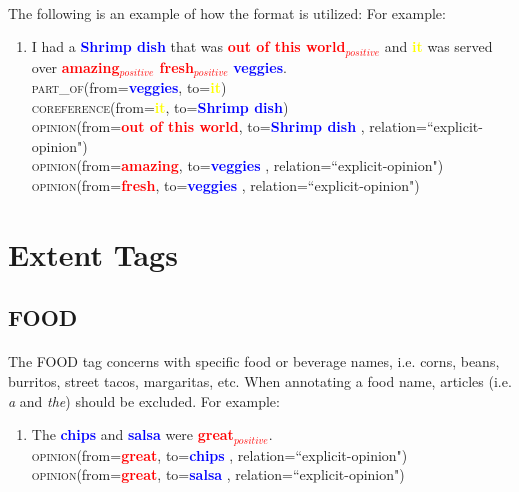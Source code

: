\documentclass{article}
\begin{document}
\paragraph{}
The following is an example of how the format is utilized:
For example:
\begin{enumerate}
\item I had a \textbf{\textcolor{blue}{Shrimp dish}} that was \textbf{\textcolor{red}{out of this world$_{positive}$}} and \textbf{\textcolor{yellow}{it}} was served over \textbf{\textcolor{red}{amazing$_{positive}$ fresh$_{positive}$}} \textbf{\textcolor{blue}{veggies}}. \\
\textsc{part\_of}(from=\textbf{\textcolor{blue}{veggies}}, to=\textbf{\textcolor{yellow}{it}}) \\
\textsc{coreference}(from=\textbf{\textcolor{yellow}{it}}, to=\textbf{\textcolor{blue}{Shrimp dish}})\\
\textsc{opinion}(from=\textbf{\textcolor{red}{out of this world}}, to=\textbf{\textcolor{blue}{Shrimp dish}} , relation=``explicit-opinion")\\
\textsc{opinion}(from=\textbf{\textcolor{red}{amazing}}, to=\textbf{\textcolor{blue}{veggies}} , relation=``explicit-opinion")\\
\textsc{opinion}(from=\textbf{\textcolor{red}{fresh}}, to=\textbf{\textcolor{blue}{veggies}} , relation=``explicit-opinion")
\end{enumerate}

\newpage
\section{Extent Tags}

\subsection{FOOD}
\paragraph{}
The FOOD tag concerns with specific food or beverage names, i.e. corns, beans, burritos, street tacos, margaritas, etc. When annotating a food name, articles (i.e. \textit{a} and \textit{the}) should be excluded. For example:
\begin{enumerate}[resume]
\item The \textbf{\textcolor{blue}{chips}} and \textbf{\textcolor{blue}{salsa}} were \textbf{\textcolor{red}{great$_{positive}$}}.\\
\textsc{opinion}(from=\textbf{\textcolor{red}{great}}, to=\textbf{\textcolor{blue}{chips}} , relation=``explicit-opinion")\\
\textsc{opinion}(from=\textbf{\textcolor{red}{great}}, to=\textbf{\textcolor{blue}{salsa}} , relation=``explicit-opinion")
\end{enumerate}
\end{document}
